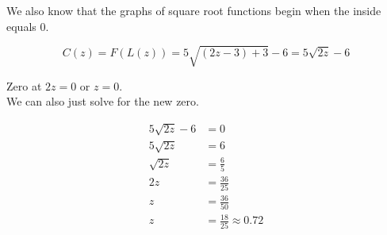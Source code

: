 \documentclass{ximera}
\begin{document}
\begin{example}
\begin{image}
\end{image}





We also know that the graphs of square root functions begin when the inside equals $0$. 

\[
C(z) = F(L(z)) = 5 \sqrt{(2z - 3) + 3} - 6 = 5 \sqrt{2z} - 6
\]


Zero at $2z = 0$ or $z = 0$. \\

We can also just solve for the new zero.




\begin{align*}
5 \sqrt{2z} - 6 &= 0 \\
5 \sqrt{2z}     &= 6 \\
\sqrt{2z}       &= \frac{6}{5} \\
2z            &= \frac{36}{25}  \\
z                  &= \frac{36}{50} \\
z                 &= \frac{18}{25} \approx 0.72
\end{align*}




\end{example}
\end{document}
